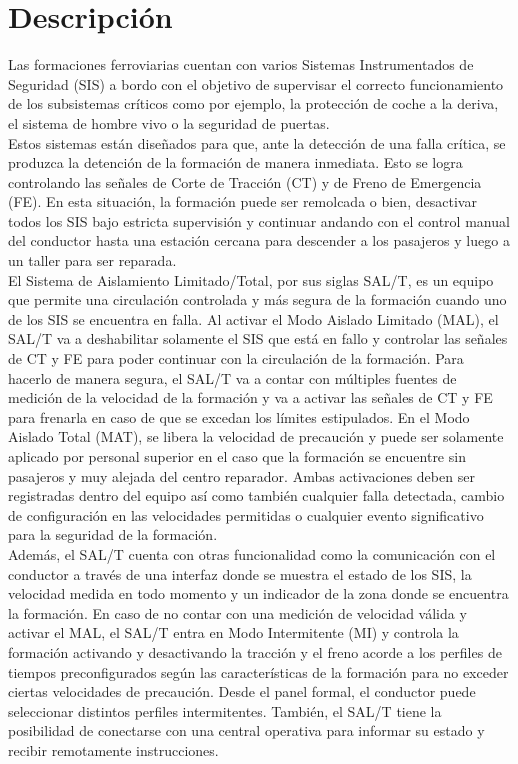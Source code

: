 
\section{Descripción}

Las formaciones ferroviarias cuentan con varios Sistemas Instrumentados de Seguridad (SIS) a bordo con el objetivo de supervisar el correcto funcionamiento de los subsistemas críticos como por ejemplo, la protección de coche a la deriva, el sistema de hombre vivo o la seguridad de puertas. \\

Estos sistemas están diseñados para que, ante la detección de una falla crítica, se produzca la detención de la formación de manera inmediata. Esto se logra controlando las señales de Corte de Tracción (CT) y de Freno de Emergencia (FE). En esta situación, la formación puede ser remolcada o bien, desactivar todos los SIS bajo estricta supervisión y continuar andando con el control manual del conductor hasta una estación cercana para descender a los pasajeros y luego a un taller para ser reparada. \\

El Sistema de Aislamiento Limitado/Total, por sus siglas SAL/T, es un equipo que permite una circulación controlada y más segura de la formación cuando uno de los SIS se encuentra en falla. Al  activar el Modo Aislado Limitado (MAL), el SAL/T va a deshabilitar solamente el SIS que está en fallo y controlar las señales de CT y FE para poder continuar con la circulación de la formación. Para hacerlo de manera segura, el SAL/T va a contar con múltiples fuentes de medición de la velocidad de la formación y va a activar las señales de CT y FE para frenarla en caso de que se excedan los límites estipulados. En el Modo Aislado Total (MAT), se libera la velocidad de precaución y puede ser solamente aplicado por personal superior en el caso que la formación se encuentre sin pasajeros y muy alejada del centro reparador. Ambas activaciones deben ser registradas dentro del equipo así como también cualquier falla detectada, cambio de configuración en las velocidades permitidas o cualquier evento significativo para la seguridad de la formación.\\

Además, el SAL/T cuenta con otras funcionalidad como la comunicación con el conductor a través de una interfaz donde se muestra el estado de los SIS, la velocidad medida en todo momento y un indicador de la zona donde se encuentra la formación. En caso de no contar con una medición de velocidad válida y activar el MAL, el SAL/T entra en Modo Intermitente (MI) y controla la formación activando y desactivando la tracción y el freno acorde a los perfiles de tiempos preconfigurados según las características de la formación para no exceder ciertas velocidades de precaución. Desde el panel formal, el conductor puede seleccionar distintos perfiles intermitentes.  También, el SAL/T tiene la posibilidad de conectarse con una central operativa para informar su estado y recibir remotamente instrucciones. \\

